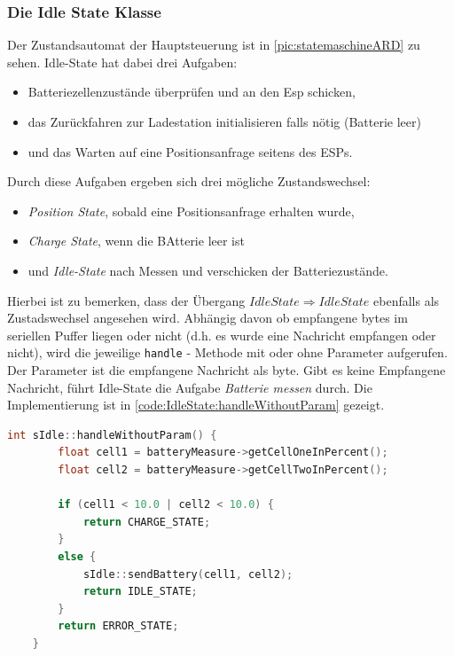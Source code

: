 \subsubsection{Die Idle State Klasse}
\label{sec:IdleState}
Der Zustandsautomat der Hauptsteuerung ist in \autoref{pic:statemaschineARD} zu sehen.
Idle-State hat dabei drei Aufgaben:
\begin{center}
	\begin{itemize}
		\item Batteriezellenzustände überprüfen und an den Esp schicken,
		\item das Zurückfahren zur Ladestation initialisieren falls nötig (Batterie leer)
		\item und das Warten auf eine Positionsanfrage seitens des ESPs.
	\end{itemize}
\end{center}
 Durch diese Aufgaben ergeben sich drei mögliche Zustandswechsel:
 \begin{center}
	\begin{itemize}
		\item \textit{Position State}, sobald eine Positionsanfrage erhalten wurde,
		\item \textit{Charge State}, wenn die BAtterie leer ist
		\item und \textit{Idle-State} nach Messen und verschicken der Batteriezustände.
	\end{itemize}
\end{center}
Hierbei ist zu bemerken, dass der Übergang $Idle State \Rightarrow  Idle State$ ebenfalls als Zustadswechsel angesehen wird.
Abhängig davon ob empfangene bytes im seriellen Puffer liegen oder nicht (d.h. es wurde eine Nachricht empfangen oder nicht), wird die jeweilige \texttt{handle} - Methode mit oder ohne Parameter aufgerufen. Der Parameter ist die empfangene Nachricht als byte.
Gibt es keine Empfangene Nachricht, führt Idle-State die Aufgabe \textit{Batterie messen} durch. Die Implementierung ist in \autoref{code:IdleState:handleWithoutParam} gezeigt.
\begin{lstlisting}[language=c, style=dhpaperdefault]
	int sIdle::handleWithoutParam() {
		float cell1 = batteryMeasure->getCellOneInPercent();
		float cell2 = batteryMeasure->getCellTwoInPercent();

		if (cell1 < 10.0 | cell2 < 10.0) {
			return CHARGE_STATE;
		}
		else {
			sIdle::sendBattery(cell1, cell2);
			return IDLE_STATE;
		}
		return ERROR_STATE;
	}
\end{lstlisting}
